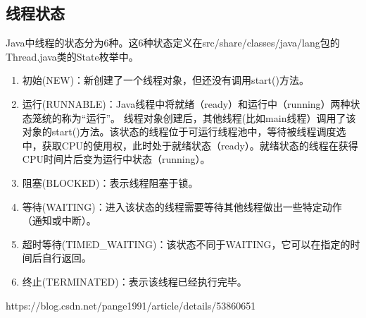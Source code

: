 \documentclass[../../../interview-questions.tex]{subfiles}
\begin{document}
\subsection{线程状态}

Java中线程的状态分为6种。这6种状态定义在src/share/classes/java/lang包的Thread.java类的State枚举中。

\begin{enumerate}
    \item {初始(NEW)：新创建了一个线程对象，但还没有调用start()方法。}
    \item {运行(RUNNABLE)：Java线程中将就绪（ready）和运行中（running）两种状态笼统的称为“运行”。
    线程对象创建后，其他线程(比如main线程）调用了该对象的start()方法。该状态的线程位于可运行线程池中，等待被线程调度选中，获取CPU的使用权，此时处于就绪状态（ready）。就绪状态的线程在获得CPU时间片后变为运行中状态（running）。}
    \item {阻塞(BLOCKED)：表示线程阻塞于锁。}
    \item {等待(WAITING)：进入该状态的线程需要等待其他线程做出一些特定动作（通知或中断）。}
    \item {超时等待(TIMED\_WAITING)：该状态不同于WAITING，它可以在指定的时间后自行返回。}
    \item {终止(TERMINATED)：表示该线程已经执行完毕。}
\end{enumerate}

https://blog.csdn.net/pange1991/article/details/53860651
\end{document}
